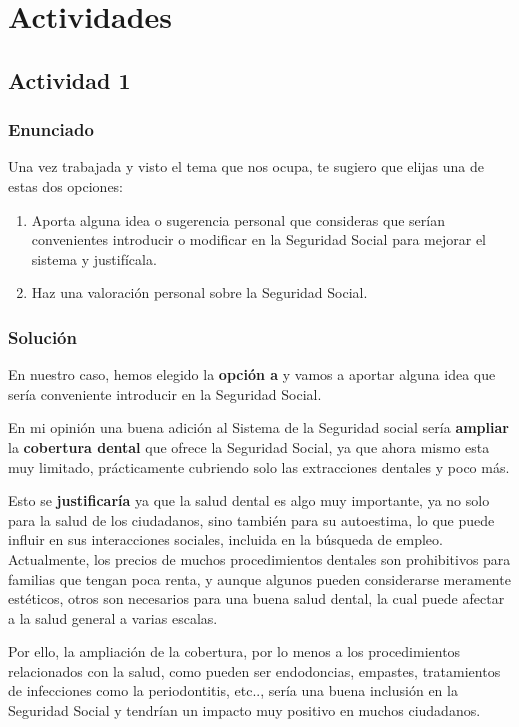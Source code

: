 \section{Actividades}

\subsection{Actividad 1}

\subsubsection{Enunciado}
Una vez trabajada y visto el tema que nos ocupa, te sugiero que elijas una de estas dos opciones:

\begin{enumerate}[label=\alph*)]
    \item Aporta alguna idea o sugerencia personal que consideras que serían convenientes introducir o modificar en la Seguridad Social para mejorar el sistema y justifícala.
    \item Haz una valoración personal sobre la Seguridad Social.
\end{enumerate}

\subsubsection{Solución}
En nuestro caso, hemos elegido la \textbf{opción a} y vamos a aportar alguna idea que sería conveniente introducir en la Seguridad Social.

En mi opinión una buena adición al Sistema de la Seguridad social sería \textbf{ampliar} la \textbf{cobertura dental} que ofrece la Seguridad Social, ya que ahora mismo esta muy limitado, prácticamente cubriendo solo las extracciones dentales y poco más.

Esto se \textbf{justificaría} ya que la salud dental es algo muy importante, ya no solo para la salud de los ciudadanos, sino también para su autoestima, lo que puede influir en sus interacciones sociales, incluida en la búsqueda de empleo. Actualmente, los precios de muchos procedimientos dentales son prohibitivos para familias que tengan poca renta, y aunque algunos pueden considerarse meramente estéticos, otros son necesarios para una buena salud dental, la cual puede afectar a la salud general a varias escalas.

Por ello, la ampliación de la cobertura, por lo menos a los procedimientos relacionados con la salud, como pueden ser endodoncias, empastes, tratamientos de infecciones como la periodontitis, etc.., sería una buena inclusión en la Seguridad Social y tendrían un  impacto muy positivo en muchos ciudadanos.

